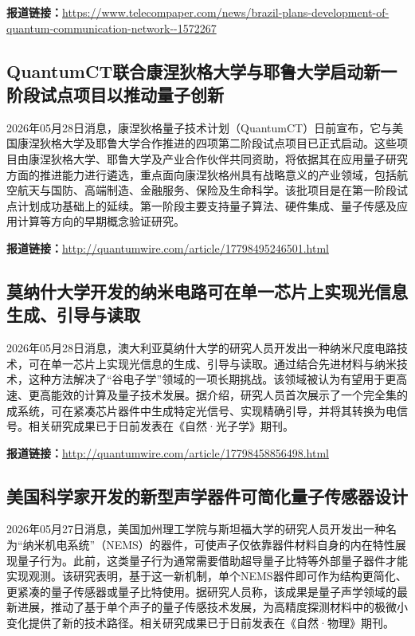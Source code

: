 \documentclass[12pt,a4paper]{ctexart}
\begin{document}
\noindent\textbf{报道链接：}\url{https://www.telecompaper.com/news/brazil-plans-development-of-quantum-communication-network--1572267}

\subsection{ QuantumCT联合康涅狄格大学与耶鲁大学启动新一阶段试点项目以推动量子创新 }

2026年05月28日消息，康涅狄格量子技术计划（QuantumCT）日前宣布，它与美国康涅狄格大学及耶鲁大学合作推进的四项第二阶段试点项目已正式启动。这些项目由康涅狄格大学、耶鲁大学及产业合作伙伴共同资助，将依据其在应用量子研究方面的推进能力进行遴选，重点面向康涅狄格州具有战略意义的产业领域，包括航空航天与国防、高端制造、金融服务、保险及生命科学。该批项目是在第一阶段试点计划成功基础上的延续。第一阶段主要支持量子算法、硬件集成、量子传感及应用计算等方向的早期概念验证研究。

\noindent\textbf{报道链接：}\url{http://quantumwire.com/article/17798495246501.html}

\subsection{ 莫纳什大学开发的纳米电路可在单一芯片上实现光信息生成、引导与读取 }

2026年05月28日消息，澳大利亚莫纳什大学的研究人员开发出一种纳米尺度电路技术，可在单一芯片上实现光信息的生成、引导与读取。通过结合先进材料与纳米技术，这种方法解决了“谷电子学”领域的一项长期挑战。该领域被认为有望用于更高速、更高能效的计算及量子技术发展。据介绍，研究人员首次展示了一个完全集的成系统，可在紧凑芯片器件中生成特定光信号、实现精确引导，并将其转换为电信号。相关研究成果已于日前发表在《自然·光子学》期刊。

\noindent\textbf{报道链接：}\url{http://quantumwire.com/article/17798458856498.html}

\subsection{ 美国科学家开发的新型声学器件可简化量子传感器设计 }

2026年05月27日消息，美国加州理工学院与斯坦福大学的研究人员开发出一种名为“纳米机电系统”（NEMS）的器件，可使声子仅依靠器件材料自身的内在特性展现量子行为。此前，这类量子行为通常需要借助超导量子比特等外部量子器件才能实现观测。该研究表明，基于这一新机制，单个NEMS器件即可作为结构更简化、更紧凑的量子传感器或量子比特使用。据研究人员称，该成果是量子声学领域的最新进展，推动了基于单个声子的量子传感技术发展，为高精度探测材料中的极微小变化提供了新的技术路径。相关研究成果已于日前发表在《自然·物理》期刊。
\end{document}
